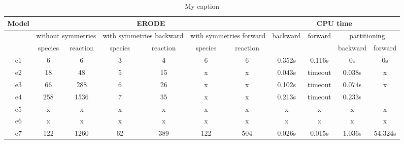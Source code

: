 \begin{table}[]
\centering
\caption{My caption}
\label{my-label}
\begin{tabular}{@{}|c|c|c|c|c|c|c|c|c|c|c|@{}}
\toprule
Model & \multicolumn{6}{c|}{ERODE}                                                                                                             & \multicolumn{4}{c|}{CPU time}                          \\ \midrule
      & \multicolumn{2}{c|}{without symmetries} & \multicolumn{2}{c|}{with symmetries backward} & \multicolumn{2}{c|}{with symmetries forward} & backward & forward & \multicolumn{2}{c|}{partitioning} \\ \midrule
      & species            & reaction           & species               & reaction              & species              & reaction              &          &         & backward         & forward        \\ \midrule
e1    & 6                  & 6                  & 3                     & 4                     & 6                    & 6                     & 0.352s   & 0.116s  & 0s               & 0s             \\ \midrule
e2    & 18                 & 48                 & 5                     & 15                    & x                    & x                     & 0.043s   & timeout & 0.038s           & x              \\ \midrule
e3    & 66                 & 288                & 6                     & 26                    & x                    & x                     & 0.102s   & timeout & 0.074s           & x              \\ \midrule
e4    & 258                & 1536               & 7                     & 35                    & x                    & x                     & 0.213s   & timeout & 0.233s           &                \\ \midrule
e5    & x                  & x                  & x                     & x                     & x                    & x                     & x        & x       & x                & x              \\ \midrule
e6    & x                  & x                  & x                     & x                     & x                    & x                     & x        & x       & x                & x              \\ \midrule
e7    & 122                & 1260               & 62                    & 389                   & 122                  & 504                   & 0.026s   & 0.015s  & 1.036s           & 54.324s        \\ \midrule

\end{tabular}
\end{table}
